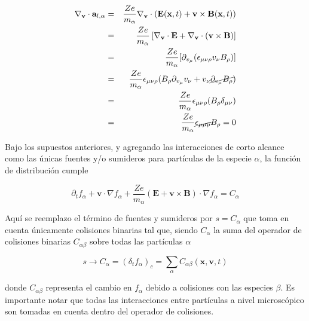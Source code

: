 \begin{eqnarray}
  \nabla_\textbf{v}\cdot\textbf{a}_{l, \alpha} &=& \frac{Ze}{m_\alpha}\nabla_\textbf{v}\cdot(\textbf{E}(\textbf{x},t) + \textbf{v}\times\textbf{B}(\textbf{x},t))\nonumber\\
                                   &=& \frac{Ze}{m_\alpha}\left[\nabla_\textbf{v}\cdot \textbf{E} + \nabla_\textbf{v}\cdot(\textbf{v}\times\textbf{B})\right] \nonumber\\
                                   &=& \frac{Ze}{m_\alpha}[\partial_{v_\mu} (\epsilon_{\mu\nu\rho} v_{\nu}B_{\rho})] \nonumber \\
                                   &=& \frac{Ze}{m_\alpha}\epsilon_{\mu\nu\rho}(B_\rho \partial_{v_\mu}v_{\nu} + v_\nu\cancel{\partial_{v_\mu}B_\rho}) \nonumber \\
                                   &=& \frac{Ze}{m_\alpha}\epsilon_{\mu\nu\rho}(B_\rho\delta_{\mu\nu})\nonumber \\
                                   &=& \frac{Ze}{m_\alpha}\cancel{\epsilon_{\mu\mu\rho}}B_\rho = 0
\end{eqnarray}

Bajo los supuestos anteriores, y agregando las interacciones de corto alcance como las \'unicas fuentes y/o sumideros para part\'iculas de la especie $\alpha$, la funci\'on de distribuci\'on cumple 

\begin{equation}
  \partial_t f_\alpha + \textbf{v}\cdot\nabla f_\alpha + \frac{Ze}{m_\alpha}(\textbf{E} + \textbf{v}\times\textbf{B})\cdot\nabla f_\alpha = C_\alpha
\end{equation}

Aqu\'i se reemplazo el t\'ermino de fuentes y sumideros por $s = C_\alpha$ que toma en cuenta \'unicamente colisiones binarias tal que, siendo $C_\alpha$ la suma del operador de colisiones binarias $C_{\alpha\beta}$ sobre todas las part\'iculas $\alpha$

\begin{equation}
  s \rightarrow C_\alpha = (\delta_t f_\alpha)_c = \sum_\alpha C_{\alpha\beta}(\textbf{x}, \textbf{v},t)
\end{equation}

donde $C_{\alpha\beta}$ representa el cambio en $f_\alpha$ debido a colisiones con las especies $\beta$. Es importante notar que todas las interacciones entre part\'iculas a nivel microsc\'opico son tomadas en cuenta dentro del operador de colisiones.
